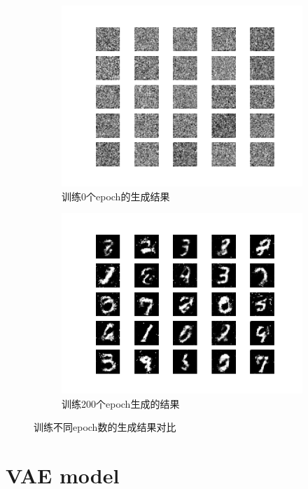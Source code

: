 \documentclass[]{report}
\begin{document}
\begin{figure}[htbp]
	\centering
	\begin{subfigure}[b]{0.4\linewidth}
		\includegraphics[width=\linewidth]{./images/0.png}
		\caption{训练0个epoch的生成结果}
		\label{fig:epoch0}
	\end{subfigure}
	\hfill %
	\begin{subfigure}[b]{0.4\linewidth}
		\includegraphics[width=\linewidth]{./images/200.png}
		\caption{训练200个epoch生成的结果}
		\label{fig:epoch200}
	\end{subfigure}
	\caption{训练不同epoch数的生成结果对比}
	\label{fig:epochs_comparison}
\end{figure}
\chapter{VAE model}
\end{document}
